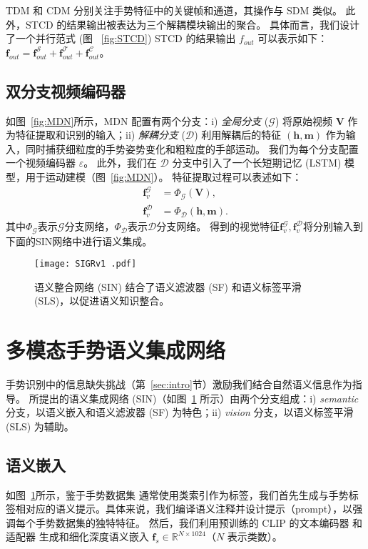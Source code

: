 TDM 和 CDM 分别关注手势特征中的关键帧和通道，其操作与 SDM 类似。
此外，STCD 的结果输出被表达为三个解耦模块输出的聚合。
具体而言，我们设计了一个并行范式 (图 ~\ref{fig:STCD})
STCD 的结果输出 ${f}_{out}$ 可以表示如下：$\mathbf{f}_{out} = \mathbf{f}_{out}^{\mathcal{S}} + \mathbf{f}_{out}^{\mathcal{T}} + \mathbf{f}_{out}^{\mathcal{C}}$。

\subsection{双分支视频编码器}
\label{sec:DBVE}
如图~\ref{fig:MDN}所示，MDN 配置有两个分支：i) \emph{全局分支} ($\mathcal{G}$) 将原始视频 $\mathbf{V}$ 作为特征提取和识别的输入；ii) \emph{解耦分支} ($\mathcal{D}$) 利用解耦后的特征 $\mathbf{(h, m)}$ 作为输入，同时捕获细粒度的手势姿势变化和粗粒度的手部运动。
我们为每个分支配置一个视频编码器 $\varepsilon$。
此外，我们在 $\mathcal{D}$ 分支中引入了一个长短期记忆 (LSTM) 模型，用于运动建模（图~\ref{fig:MDN}）。
特征提取过程可以表述如下：
\begin{equation}
\label{eq:fv}
\begin{aligned}
  \mathbf{f}_{v}^{\mathcal{G}} &= \Phi_{\mathcal{G}}(\mathbf{V}), \\
  \mathbf{f}_{v}^{\mathcal{D}} &= \Phi_{\mathcal{D}}(\mathbf{h}, \mathbf{m}).
\end{aligned}
\end{equation}
其中$\Phi_{\mathcal{G}}$表示$\mathcal{G}$分支网络，$\Phi_{\mathcal{D}}$表示$\mathcal{D}$分支网络。
得到的视觉特征$\mathbf{f}_{v}^{\mathcal{G}}, \mathbf{f}_{v}^{\mathcal{D}}$将分别输入到下面的SIN网络中进行语义集成。

\begin{figure}[tb]
\centering
\texttt{[image: SIGRv1 .pdf]}
\caption{语义整合网络 (SIN) 结合了语义滤波器 (SF) 和语义标签平滑 (SLS)，以促进语义知识整合。 }
\label{fig:SIN}
\end{figure}
\section{多模态手势语义集成网络}
\label{sec:SIN}
手势识别中的信息缺失挑战（第~\ref{sec:intro}节）激励我们结合自然语义信息作为指导。
所提出的语义集成网络 (SIN)（如图~\ref{fig:SIN} 所示）由两个分支组成：i) \emph{semantic} 分支，以语义嵌入和语义滤波器 (SF) 为特色；ii) \emph{vision} 分支，以语义标签平滑 (SLS) 为辅助。

\subsection{语义嵌入}
如图~\ref{fig:SIN}所示，鉴于手势数据集 \cite{wan2020chalearn,tang2017action,molchanov2016online} 通常使用类索引作为标签，我们首先生成与手势标签相对应的语义提示。具体来说，我们编译语义注释并设计提示（prompt），以强调每个手势数据集的独特特征。
然后，我们利用预训练的 CLIP 的文本编码器 \cite{radford2021learning} 和适配器 \cite{gao2024clip} 生成和细化深度语义嵌入 $\mathbf{f}_{s}\in \mathbb{R}^{N\times 1024}$（$N$ 表示类数）。%

